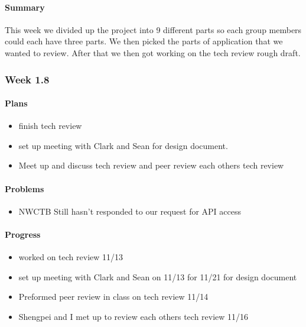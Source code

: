 \documentclass[onecolumn, draftclsnofoot,10pt, compsoc]{article}
\begin{document}
		    \paragraph{Summary} \hfill \break
		        This week we divided up the project into 9 different parts so each group members could each have three parts. We then picked the parts of application that we wanted to review. After that we then got working on the tech review rough draft.\\

		\subsubsection{Week 1.8}

			\paragraph{Plans} \hfill \break
			    \begin{itemize}
			        \item finish tech review
			        \item set up meeting with Clark and Sean for design document.
			        \item Meet up and discuss tech review and peer review each others tech review
			    \end{itemize}

		    \paragraph{Problems} \hfill \break
		        \begin{itemize}
		            \item NWCTB Still hasn't responded to our request for API access
		        \end{itemize}

		    \paragraph{Progress} \hfill \break
		        \begin{itemize}
		            \item worked on tech review 11/13
		            \item set up meeting with Clark and Sean on 11/13 for 11/21 for design document
		            \item Preformed peer review in class on tech review 11/14
		            \item Shengpei and I met up to review each others tech review 11/16
		        \end{itemize}
\end{document}
